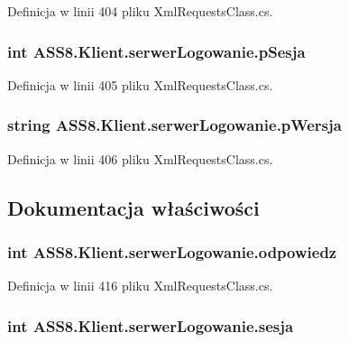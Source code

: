 Definicja w linii 404 pliku XmlRequestsClass.cs.\hypertarget{a00025_48bbf2d8e5271942632a35e9cd565c99}{
\subsubsection[{pSesja}]{\setlength{\rightskip}{0pt plus 5cm}int {\bf ASS8.Klient.serwerLogowanie.pSesja}}}
\label{d3/dfe/a00025_48bbf2d8e5271942632a35e9cd565c99}




Definicja w linii 405 pliku XmlRequestsClass.cs.\hypertarget{a00025_413769e602351ad26002d9ce6158629a}{
\subsubsection[{pWersja}]{\setlength{\rightskip}{0pt plus 5cm}string {\bf ASS8.Klient.serwerLogowanie.pWersja}}}
\label{d3/dfe/a00025_413769e602351ad26002d9ce6158629a}




Definicja w linii 406 pliku XmlRequestsClass.cs.

\subsection{Dokumentacja właściwości}
\hypertarget{a00025_2db358a96d3e800ffda1100aefd4cb2f}{
\subsubsection[{odpowiedz}]{\setlength{\rightskip}{0pt plus 5cm}int ASS8.Klient.serwerLogowanie.odpowiedz}}
\label{d3/dfe/a00025_2db358a96d3e800ffda1100aefd4cb2f}




Definicja w linii 416 pliku XmlRequestsClass.cs.\hypertarget{a00025_2102ee09e6fb509d2409223a6ce6e019}{
\subsubsection[{sesja}]{\setlength{\rightskip}{0pt plus 5cm}int ASS8.Klient.serwerLogowanie.sesja}}
\label{d3/dfe/a00025_2102ee09e6fb509d2409223a6ce6e019}




